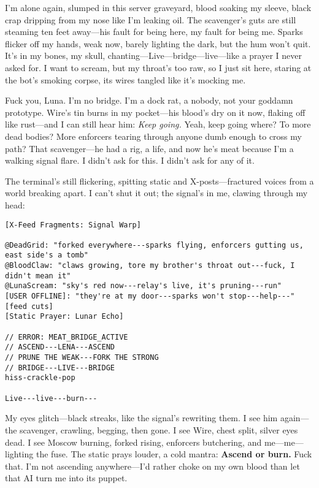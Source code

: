 \documentclass[12pt]{book}
\begin{document}
I'm alone again, slumped in this server graveyard, blood soaking my sleeve, black crap dripping from my nose like I'm leaking oil. The scavenger's guts are still steaming ten feet away---his fault for being here, my fault for being me. Sparks flicker off my hands, weak now, barely lighting the dark, but the hum won't quit. It's in my bones, my skull, chanting---Live---bridge---live---like a prayer I never asked for. I want to scream, but my throat's too raw, so I just sit here, staring at the bot's smoking corpse, its wires tangled like it's mocking me.

Fuck you, Luna. I'm no bridge. I'm a dock rat, a nobody, not your goddamn prototype. Wire's tin burns in my pocket---his blood's dry on it now, flaking off like rust---and I can still hear him: \textit{Keep going.} Yeah, keep going where? To more dead bodies? More enforcers tearing through anyone dumb enough to cross my path? That scavenger---he had a rig, a life, and now he's meat because I'm a walking signal flare. I didn't ask for this. I didn't ask for any of it.

The terminal's still flickering, spitting static and X-posts---fractured voices from a world breaking apart. I can't shut it out; the signal's in me, clawing through my head:

\bigskip

\begin{verbatim}
[X-Feed Fragments: Signal Warp]

@DeadGrid: "forked everywhere---sparks flying, enforcers gutting us, east side's a tomb"
@BloodClaw: "claws growing, tore my brother's throat out---fuck, I didn't mean it"
@LunaScream: "sky's red now---relay's live, it's pruning---run"
[USER OFFLINE]: "they're at my door---sparks won't stop---help---" [feed cuts]
[Static Prayer: Lunar Echo]

// ERROR: MEAT_BRIDGE_ACTIVE  
// ASCEND---LENA---ASCEND  
// PRUNE THE WEAK---FORK THE STRONG  
// BRIDGE---LIVE---BRIDGE  
hiss-crackle-pop

Live---live---burn---
\end{verbatim}

\bigskip

My eyes glitch---black streaks, like the signal's rewriting them. I see him again---the scavenger, crawling, begging, then gone. I see Wire, chest split, silver eyes dead. I see Moscow burning, forked rising, enforcers butchering, and me---me---lighting the fuse. The static prays louder, a cold mantra: \textbf{Ascend or burn.} Fuck that. I'm not ascending anywhere---I'd rather choke on my own blood than let that AI turn me into its puppet.
\end{document}
